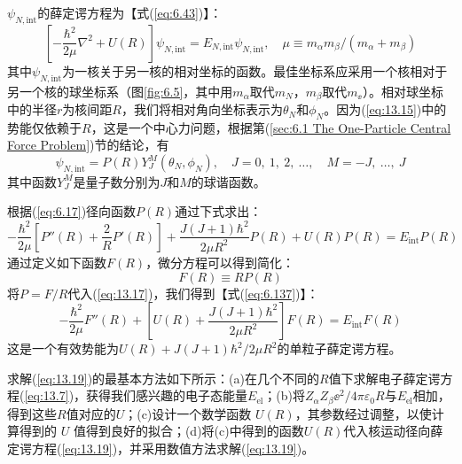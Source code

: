     $\psi_{N,\text{int}}$的薛定谔方程为【式(\ref{eq:6.43})】：
    \begin{equation}
        \left[-\frac{\hbar^2}{2\mu}\nabla^2 + U\left(R\right)\right]\psi_{N,\text{int}} = E_{N,\text{int}}\psi_{N,\text{int}}, \quad \mu \equiv m_{\alpha}m_{\beta}/\left(m_{\alpha} + m_{\beta}\right)
        \label{eq:13.15}
    \end{equation}
    其中$\psi_{N,\text{int}}$为一核关于另一核的相对坐标的函数。最佳坐标系应采用一个核相对于另一个核的球坐标系（图\ref{fig:6.5}，其中用$m_{\alpha}$取代$m_N$，$m_{\beta}$取代$m_{\ee }$）。相对球坐标中的半径$r$为核间距$R$，我们将相对角向坐标表示为$\theta_N$和$\phi_N$。因为(\ref{eq:13.15})中的势能仅依赖于$R$，这是一个中心力问题，根据第(\ref{sec:6.1 The One-Particle Central Force Problem})节的结论，有
    \begin{equation}
        \psi_{N,\text{int}} = P\left(R\right)Y_J^M\left(\theta_N,\phi_N\right), \quad J = 0,\:1,\:2,\:\ldots, \quad M = -J,\: \ldots,\: J
        \label{eq:13.16}
    \end{equation}
    其中函数$Y_J^M$是量子数分别为$J$和$M$的球谐函数。

    根据(\ref{eq:6.17})径向函数$P\left(R\right)$通过下式求出：
    \begin{equation}
        -\frac{\hbar^2}{2\mu}\left[P''\left(R\right) + \frac{2}{R}P'\left(R\right)\right] + \frac{J\left(J+1\right)\hbar^2}{2\mu R^2}P\left(R\right) + U\left(R\right)P\left(R\right) = E_{\text{int}}P\left(R\right)
        \label{eq:13.17}
    \end{equation}
    通过定义如下函数$F\left(R\right)$，微分方程可以得到简化：
    \begin{equation}
        F\left(R\right) \equiv R P\left(R\right)
        \label{eq:13.18}
    \end{equation}
    将$P = F/R$代入(\ref{eq:13.17})，我们得到【式(\ref{eq:6.137})】：
    \begin{equation}
        -\frac{\hbar^2}{2\mu}F''\left(R\right) + \left[U\left(R\right) + \frac{J\left(J+1\right)\hbar^2}{2\mu R^2}\right]F\left(R\right) = E_{\text{int}}F\left(R\right)
        \label{eq:13.19}
    \end{equation}
    这是一个有效势能为$U\left(R\right) + J\left(J+1\right)\hbar^2/2\mu R^2$的单粒子薛定谔方程。

    求解(\ref{eq:13.19})的最基本方法如下所示：(a)在几个不同的$R$值下求解电子薛定谔方程(\ref{eq:13.7})，获得我们感兴趣的电子态能量$E_{\text{el}}$；(b)将$Z_{\alpha}Z_{\beta}\ee ^2/4\pi\varepsilon_0 R$与$E_{\text{el}}$相加，得到这些$R$值对应的$U$；(c)设计一个数学函数 $U\left(R\right)$，其参数经过调整，以使计算得到的 $U$ 值得到良好的拟合；(d)将(c)中得到的函数$U\left(R\right)$代入核运动径向薛定谔方程(\ref{eq:13.19})，并采用数值方法求解(\ref{eq:13.19})。

